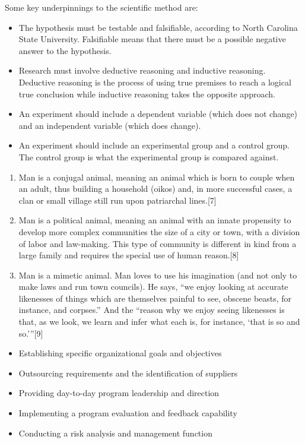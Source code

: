 Some key underpinnings to the scientific method are:
\begin{itemize}
	\item The hypothesis must be testable and falsifiable, according to North Carolina State University. Falsifiable means that there must be a possible negative answer to the hypothesis.
	\item Research must involve deductive reasoning and inductive reasoning. Deductive reasoning is the process of using true premises to reach a logical true conclusion while inductive reasoning takes the opposite approach.
	\item An experiment should include a dependent variable (which does not change) and an independent variable (which does change).
	\item An experiment should include an experimental group and a control group. The control group is what the experimental group is compared against.
\end{itemize}

\begin{enumerate}
	\item Man is a conjugal animal, meaning an animal which is born to couple when an adult, thus building a household (oikos) and, in more successful cases, a clan or small village still run upon patriarchal lines.[7]
	\item Man is a political animal, meaning an animal with an innate propensity to develop more complex communities the size of a city or town, with a division of labor and law-making. This type of community is different in kind from a large family and requires the special use of human reason.[8]
	\item Man is a mimetic animal. Man loves to use his imagination (and not only to make laws and run town councils). He says, ``we enjoy looking at accurate likenesses of things which are themselves painful to see, obscene beasts, for instance, and corpses.'' And the ``reason why we enjoy seeing likenesses is that, as we look, we learn and infer what each is, for instance, `that is so and so.'''[9]
\end{enumerate}

\begin{itemize}
	\item Establishing specific organizational goals and objectives
	\item Outsourcing requirements and the identification of suppliers
	\item Providing day-to-day program leadership and direction
	\item Implementing a program evaluation and feedback capability
	\item Conducting a risk analysis and management function
\end{itemize}

